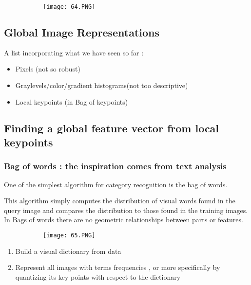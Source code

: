 \documentclass{article}
\begin{document}
\begin{figure}[ht!]
  \centering
  \begin{subfigure}[b]{0.6\linewidth}
    \texttt{[image: 64.PNG]}
  \end{subfigure}
\end{figure}

\subsection{Global Image Representations}

A list incorporating what we have seen so far : 

\begin{itemize}
    \item Pixels (not so robust)
    \item Graylevels/color/gradient histograms(not too descriptive)
    \item Local keypoints (in Bag of keypoints)
\end{itemize}

\subsection{Finding a global feature vector from local keypoints}

\subsubsection{Bag of words : the inspiration comes from text analysis}

One of the simplest algorithm for category recognition is the bag of words.

This algorithm simply computes the distribution of visual words found in the query image and compares the distribution to those found in the training images.
In Bags of words there are no geometric relationships between parts or features.  

\begin{figure}[ht!]
  \centering
  \begin{subfigure}[b]{0.6\linewidth}
    \texttt{[image: 65.PNG]}
  \end{subfigure}
\end{figure}

\begin{enumerate}
    \item Build a visual dictionary from data
    \item Represent all images with terms frequencies , or more specifically by quantizing its key points with respect to the dictionary
\end{enumerate}
\end{document}
